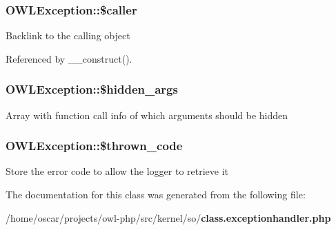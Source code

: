 \subsubsection[{\$caller}]{\setlength{\rightskip}{0pt plus 5cm}OWLException::\$caller\hspace{0.3cm}{\ttfamily  [private]}}\label{classOWLException_af59d0890c1de1187f43084ec617545f1}
Backlink to the calling object 

Referenced by \_\-\_\-construct().

\subsubsection[{\$hidden\_\-args}]{\setlength{\rightskip}{0pt plus 5cm}OWLException::\$hidden\_\-args\hspace{0.3cm}{\ttfamily  [private]}}\label{classOWLException_a6f55c054dd20e494abe9db9a9494bdda}
Array with function call info of which arguments should be hidden 
\subsubsection[{\$thrown\_\-code}]{\setlength{\rightskip}{0pt plus 5cm}OWLException::\$thrown\_\-code}\label{classOWLException_abd34d579d5f578f2e08a04c987dbea1a}
Store the error code to allow the logger to retrieve it 

The documentation for this class was generated from the following file:\begin{DoxyCompactItemize}
\item 
/home/oscar/projects/owl-\/php/src/kernel/so/{\bf class.exceptionhandler.php}\end{DoxyCompactItemize}
